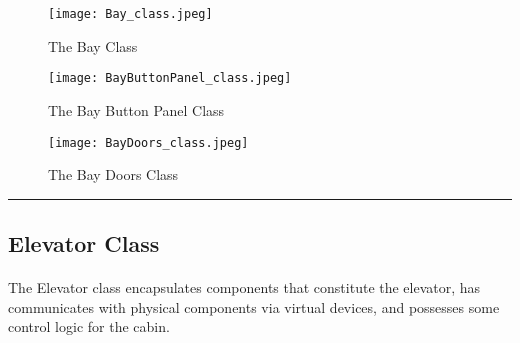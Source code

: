 \documentclass[12pt]{article}
\begin{document}
    \begin{figure}[H]
  		\centerline{\texttt{[image: Bay\_class.jpeg]}}
  		\caption{The Bay Class}
  		\label{fig:Bay_class}
	\end{figure}
    \begin{figure}[H]
  		\centerline{\texttt{[image: BayButtonPanel\_class.jpeg]}}
  		\caption{The Bay Button Panel Class}
  		\label{fig:BayButtonPanel_class}
	\end{figure}
	\begin{figure}[H]
  		\centerline{\texttt{[image: BayDoors\_class.jpeg]}}
  		\caption{The Bay Doors Class}
  		\label{fig:BayDoors_class}
	\end{figure}
	\par\noindent\rule{\textwidth}{0.4pt}
	
	\subsection*{Elevator Class}
	\paragraph{} The Elevator class encapsulates components that constitute the elevator,  
	has communicates with physical components via virtual devices, and possesses some control logic
	for the cabin.
			
\end{document}
